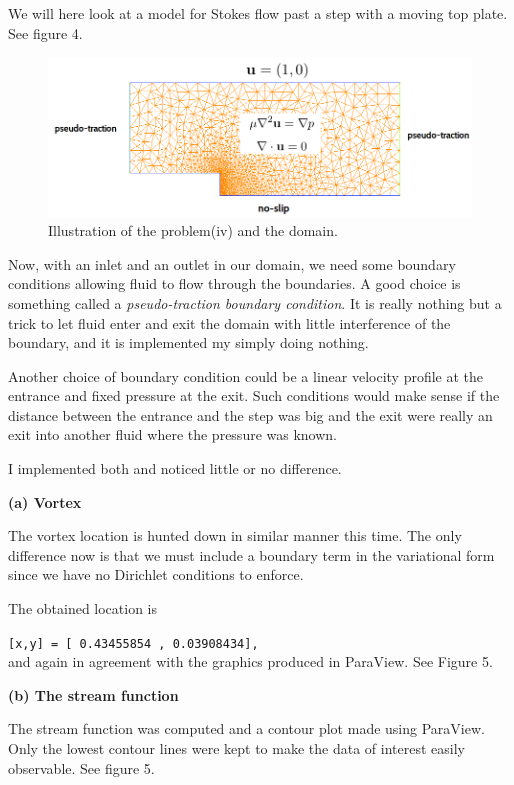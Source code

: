 \documentclass[11pt,a4paper,english]{article}
\numberwithin{equation}{section}
\begin{document}
We will here look at a model for Stokes flow past a step with a moving top plate. See figure 4.

\begin{figure}[h!]
\begin{center}
  \includegraphics[scale=0.4]{stokes_step.png}
  \end{center}
  \caption{Illustration of the problem(iv) and the domain.}
\end{figure}

Now, with an inlet and an outlet in our domain, we need some boundary conditions allowing fluid to flow through the boundaries. A good choice is something called a \emph{pseudo-traction boundary condition}. It is really nothing but a trick to let fluid enter and exit the domain with little interference of the boundary, and it is implemented my simply doing nothing. 

Another choice of boundary condition could be a linear velocity profile at the entrance and fixed pressure at the exit. Such conditions would make sense if the distance between the entrance and the step was big and the exit were really an exit into another fluid where the pressure was known. 

I implemented both and noticed little or no difference. 

\textbf{(a) Vortex}

The vortex location is hunted down in similar manner this time. The only difference now is that we must include a boundary term in the variational form since we have no Dirichlet conditions to enforce.

The obtained location is 

\texttt{[x,y] =  [ 0.43455854 , 0.03908434],} \\

and again in agreement with the graphics produced in ParaView. See Figure 5. 


\textbf{(b) The stream function}

The stream function was computed and a contour plot made using ParaView. Only the lowest contour lines were kept to make the data of interest easily observable. See figure 5. 
\end{document}
